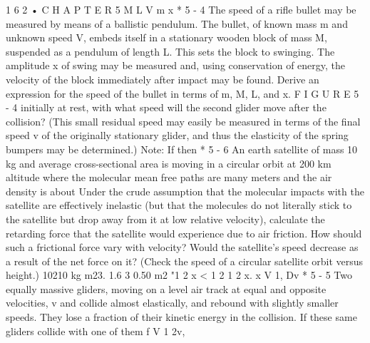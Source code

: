 \documentclass[10pt,oneside]{article}
\begin{document}
1 6 2 • C H A P T E R  5 M L V m x \emph{ } * 5 - 4 The speed of a rifle bullet may be measured by means of a ballistic pendulum. The bullet, of known mass m and unknown speed V, embeds itself in a stationary wooden block of mass M, suspended as a pendulum of length L. This sets the block to swinging. The amplitude x of swing may be measured and, using conservation of energy, the velocity of the block immediately after impact may be found. Derive an expression for the speed of the bullet in terms of m, M, L, and x. F I G U R E  5 - 4 initially at rest, with what speed will the second glider move after the collision? (This small residual speed may easily be measured in terms of the final speed v of the originally stationary glider, and thus the elasticity of the spring bumpers may be determined.) Note: If then \emph{ } * 5 - 6 An earth satellite of mass 10 kg and average cross-sectional area is moving in a circular orbit at 200 km altitude where the molecular mean free paths are many meters and the air density is about Under the crude assumption that the molecular impacts with the satellite are effectively inelastic (but that the molecules do not literally stick to the satellite but drop away from it at low relative velocity), calculate the retarding force that the satellite would experience due to air friction. How should such a frictional force vary with velocity? Would the satellite’s speed decrease as a result of the net force on it? (Check the speed of a circular satellite orbit versus height.) 10210 kg m23. 1.6 3 0.50 m2 "1 2 x < 1 2 1 2 x. x V 1, Dv \emph{ } * 5 - 5 Two equally massive gliders, moving on a level air track at equal and opposite velocities, v and collide almost elastically, and rebound with slightly smaller speeds. They lose a fraction of their kinetic energy in the collision. If these same gliders collide with one of them f V 1 2v,\par
\end{document}
